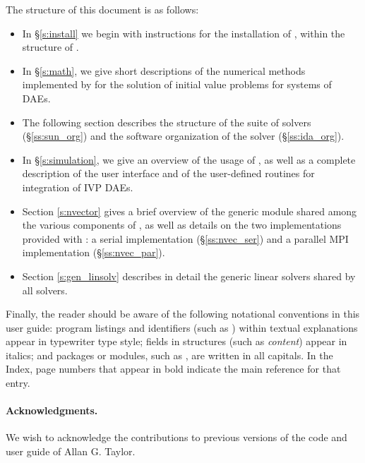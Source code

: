 The structure of this document is as follows:
\begin{itemize}
\item
  In \S\ref{s:install} we begin with instructions for the installation of 
  {\ida}, within the structure of {\sundials}.
\item
  In \S\ref{s:math}, we give short descriptions of the numerical 
  methods implemented by {\ida} for the solution of initial value problems
  for systems of DAEs.
\item
  The following section describes the structure of the {\sundials} suite
  of solvers (\S\ref{ss:sun_org}) and the software organization of the {\ida}
  solver (\S\ref{ss:ida_org}). 
\item
  In \S\ref{s:simulation}, we give an overview of the usage of {\ida},
  as well as a complete description of the user interface and of the 
  user-defined routines for integration of IVP DAEs.
\item
  Section \ref{s:nvector} gives a brief overview of the generic {\nvector} module 
  shared among the various components of {\sundials}, as well as details on the two {\nvector}
  implementations provided with {\sundials}: a serial implementation
  (\S\ref{ss:nvec_ser}) and a parallel MPI implementation (\S\ref{ss:nvec_par}).
\item
  Section \ref{s:gen_linsolv} describes in detail the generic linear solvers shared 
  by all {\sundials} solvers.
\end{itemize}

Finally, the reader should be aware of the following notational conventions
in this user guide:  program listings and identifiers (such as ) 
within textual explanations appear in typewriter type style; 
fields in {\C} structures (such as {\em content}) appear in italics;
and packages or modules, such as {\cvdense}, are written in all capitals. 
In the Index, page numbers that appear in bold indicate the main reference
for that entry.

\paragraph{Acknowledgments.}
We wish to acknowledge the contributions to previous versions of the
{\ida} code and user guide of Allan G. Taylor.

